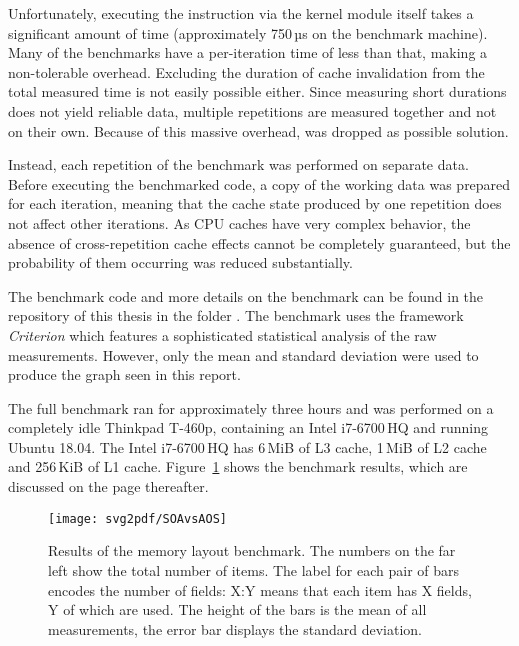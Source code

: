 Unfortunately, executing the instruction via the kernel module itself takes a significant amount of time (approximately 750\,µs on the benchmark machine).
Many of the benchmarks have a per-iteration time of less than that, making  a non-tolerable overhead.
Excluding the duration of cache invalidation from the total measured time is not easily possible either.
Since measuring short durations does not yield reliable data, multiple repetitions are measured together and not on their own.
Because of this massive overhead,  was dropped as possible solution.

Instead, each repetition of the benchmark was performed on separate data.
Before executing the benchmarked code, a copy of the working data was prepared for each iteration, meaning that the cache state produced by one repetition does not affect other iterations.
As CPU caches have very complex behavior, the absence of cross-repetition cache effects cannot be completely guaranteed, but the probability of them occurring was reduced substantially.

The benchmark code and more details on the benchmark can be found in the repository of this thesis in the folder .
The benchmark uses the framework \emph{Criterion} \cite{criterion} which features a sophisticated statistical analysis of the raw measurements.
However, only the mean and standard deviation were used to produce the graph seen in this report.

The full benchmark ran for approximately three hours and was performed on a completely idle \textsf{Thinkpad T-460p}, containing an \textsf{Intel i7-6700\,HQ} and running \textsf{Ubuntu 18.04}.
The \textsf{Intel i7-6700\,HQ} has 6\,MiB of L3 cache, 1\,MiB of L2 cache and 256\,KiB of L1 cache.
Figure~\ref{fig:memory-layout-bench} shows the benchmark results, which are discussed on the page thereafter.

\begin{figure}[p]
  \centering
  \vspace{-7mm}
  \centerline{
    \texttt{[image: svg2pdf/SOAvsAOS]}
  }
  \caption{
    Results of the memory layout benchmark.
    The numbers on the far left show the total number of items.
    The label for each pair of bars encodes the number of fields: \textsf{X:Y} means that each item has \textsf{X} fields, \textsf{Y} of which are used.
    The height of the bars is the mean of all measurements, the error bar displays the standard deviation.
  }
  \label{fig:memory-layout-bench}
\end{figure}

